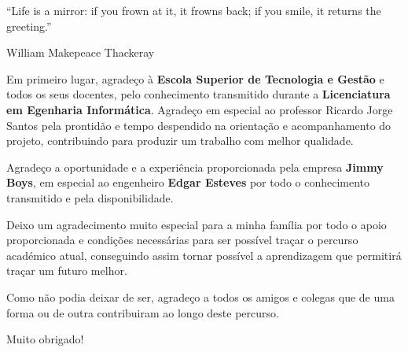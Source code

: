 
\begin{flushright}
	\begin{quotebox50}
		``Life is a mirror: if you frown at it, it frowns back; if you smile, it returns the greeting.''

		\tcblower

		William Makepeace Thackeray
	\end{quotebox50}
\end{flushright}

Em primeiro lugar, agradeço à \textbf{Escola Superior de Tecnologia e Gestão} e todos os seus docentes, pelo conhecimento transmitido durante a \textbf{Licenciatura em Egenharia Informática}. Agradeço em especial ao professor Ricardo Jorge Santos pela prontidão e tempo despendido na orientação e acompanhamento do projeto, contribuindo para produzir um trabalho com melhor qualidade.

Agradeço a oportunidade e a experiência proporcionada pela empresa \textbf{Jimmy Boys}, em especial ao engenheiro \textbf{Edgar Esteves} por todo o conhecimento transmitido e pela disponibilidade.

Deixo um agradecimento muito especial para a minha família por todo o apoio proporcionada e condições necessárias para ser possível traçar o percurso académico atual, conseguindo assim tornar possível a aprendizagem que permitirá traçar um futuro melhor.

Como não podia deixar de ser, agradeço a todos os amigos e colegas que de uma forma ou de outra contribuiram ao longo deste percurso.

Muito obrigado!

\newpage